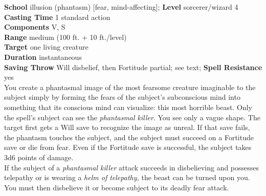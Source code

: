 \textbf{School} illusion (phantasm) [fear, mind-affecting]; \textbf{Level} sorcerer/wizard 4\\
\textbf{Casting Time} 1 standard action\\
\textbf{Components} V, S\\
\textbf{Range }medium (100 ft. + 10 ft./level)\\
\textbf{Target} one living creature\\
\textbf{Duration} instantaneous\\
\textbf{Saving Throw }Will disbelief, then Fortitude partial; see text; \textbf{Spell Resistance} yes\\
You create a phantasmal image of the most fearsome creature imaginable to the subject simply by forming the fears of the subject's subconscious mind into something that its conscious mind can visualize: this most horrible beast. Only the spell's subject can see the \textit{phantasmal killer}. You see only a vague shape. The target first gets a Will save to recognize the image as unreal. If that save fails, the phantasm touches the subject, and the subject must succeed on a Fortitude save or die from fear. Even if the Fortitude save is successful, the subject takes 3d6 points of damage.\\
If the subject of a \textit{phantasmal killer }attack succeeds in disbelieving and possesses telepathy or is wearing a \textit{helm of telepathy, }the beast can be turned upon you. You must then disbelieve it or become subject to its deadly fear attack.\\

